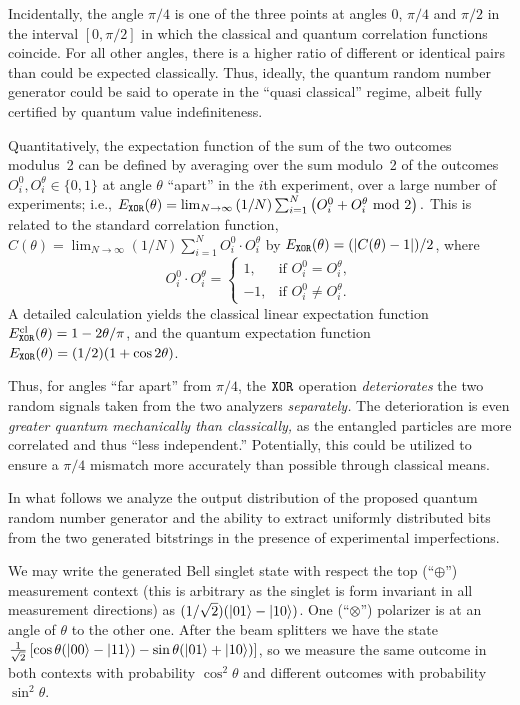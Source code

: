 \documentclass[%
 preprint,
 showpacs,
 showkeys,
 preprintnumbers,
  amsmath,amssymb,
  aps,
 pra,
  longbibliography,
  floatfix,
 ]{revtex4-1}
\theoremstyle{definition}
\begin{document}
Incidentally, the angle $\pi /4$ is one of the three points at angles $0$, $\pi /4$ and $\pi /2$ in the interval $[0, \pi /2]$
in which the classical and quantum correlation functions coincide.
For all other angles, there is a higher ratio of different or identical pairs than could be expected classically.
Thus, ideally, the quantum random number generator could be said to operate in the ``quasi classical'' regime,
albeit fully certified by quantum value indefiniteness.

Quantitatively, the expectation function of the sum of the two outcomes modulus~2 can be defined by  averaging over the sum modulo~2 of the outcomes $O^0_i, O^\theta _i\in \{0,1\}$ at angle $\theta$ ``apart''
in the $i$th experiment, over a  large number  of experiments; i.e.,
$
E_{\tt XOR}(\theta )=\lim_{N \rightarrow \infty} {(1/ N)}\sum_{i=1}^N \left( O^0_i + O^\theta _i \text{ mod }2\right).
$
This is related to the standard correlation function,
$
	C(\theta)=\lim_{N\to \infty}{(1/ N)}\sum_{i=1}^N O^0_i \cdot O^\theta_i
$
by
$
	E_{\tt XOR}(\theta)=({|C(\theta)-1|})/{2}
$,
where
\begin{equation*}
	O^0_i \cdot O^\theta_i =
	\begin{cases}
		1, & \mbox{if }O^0_i = O^\theta_i,\\
		-1, & \mbox{if }O^0_i \neq O^\theta_i.
	\end{cases}
\end{equation*}
A detailed calculation yields the classical linear expectation function
$E^{\text{cl}} _{\tt XOR}(\theta ) = {1-2 \theta / \pi}$,
and the quantum expectation function
$E_{\tt XOR}(\theta ) = (1/2)(1+\cos 2\theta )$.

Thus, for angles ``far apart'' from $\pi /4$, the ${\tt XOR}$ operation  {\em deteriorates} the two random signals taken from the two analyzers {\em separately.}
The deterioration is even {\em greater quantum mechanically than classically,} as the entangled particles are more correlated and thus ``less independent.''
Potentially, this could be utilized to ensure a $\pi/4$ mismatch more accurately than possible through classical means.


In what follows we analyze the output distribution of the proposed quantum random number generator and the ability to extract uniformly distributed bits from the two generated bitstrings in the presence of experimental imperfections.


We may write the generated Bell singlet state with respect the top (``$\oplus$'') measurement context
(this is arbitrary as the singlet is form invariant in all measurement directions) as
$({1}/{\sqrt{2}})(\ket{01} - \ket{10})$.
 One (``$\otimes$'') polarizer is at an angle of $\theta$ to the other one. After the beam splitters we have the state
$\frac{1}{\sqrt{2}}\left[\cos \theta(\ket{00}-\ket{11}) - \sin \theta (\ket{01} + \ket{10})\right]$,
 so we measure the same outcome in both contexts with probability $\cos^2\theta$ and different outcomes with probability $\sin^2\theta$.
\end{document}
